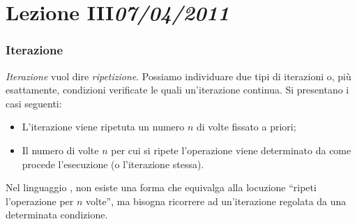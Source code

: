 \chapter[Lezione III]{Lezione III\newline\small{\emph{07/04/2011}}}
	\subsection{Iterazione}
	\label{sec:it}

\emph{Iterazione} vuol dire \emph{ripetizione}. Possiamo individuare due tipi di iterazioni o, più esattamente, condizioni verificate le quali un'iterazione continua.
Si presentano i casi seguenti:
\begin{itemize}
	\item
L'iterazione viene ripetuta un numero $n$ di volte fissato a priori;
	\item
Il numero di volte $n$ per cui si ripete l'operazione viene determinato da come procede l'esecuzione (o l'iterazione stessa).
\end{itemize}	
Nel linguaggio , non esiste una forma che equivalga alla locuzione ``ripeti l'operazione per $n$ volte'', ma bisogna ricorrere ad un'iterazione regolata da una determinata condizione.

